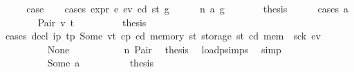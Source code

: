 \begin{isabellebody}
\ \ \isamarkupfalse%
\ \isamarkupfalse%
\ {\isacharquery}{\kern0pt}case\isanewline
\ \ \isamarkupfalse%
\ {\isacharparenleft}{\kern0pt}cases\ {\isachardoublequoteopen}expr\ e\ e\isactrlsub v\ cd\ st\ g{\isachardoublequoteclose}{\isacharparenright}{\kern0pt}\isanewline
\ \ \ \ \isamarkupfalse%
\ {\isacharparenleft}{\kern0pt}n\ a\ g{\isacharprime}{\kern0pt}{\isacharprime}{\kern0pt}{\isacharparenright}{\kern0pt}\isanewline
\ \ \ \ \isamarkupfalse%
\ \isamarkupfalse%
\ {\isacharquery}{\kern0pt}thesis\isanewline
\ \ \ \ \isamarkupfalse%
\ {\isacharparenleft}{\kern0pt}cases\ a{\isacharparenright}{\kern0pt}\isanewline
\ \ \ \ \ \ \isamarkupfalse%
\ {\isacharparenleft}{\kern0pt}Pair\ v\ t{\isacharparenright}{\kern0pt}\isanewline
\ \ \ \ \ \ \isamarkupfalse%
\ \isamarkupfalse%
\ {\isacharquery}{\kern0pt}thesis\isanewline
\ \ \ \ \ \ \isamarkupfalse%
\ {\isacharparenleft}{\kern0pt}cases\ {\isachardoublequoteopen}decl\ i\isactrlsub p\ t\isactrlsub p\ {\isacharparenleft}{\kern0pt}Some\ {\isacharparenleft}{\kern0pt}v{\isacharcomma}{\kern0pt}t{\isacharparenright}{\kern0pt}{\isacharparenright}{\kern0pt}\ cp\ cd\ {\isacharparenleft}{\kern0pt}memory\ st{\isacharparenright}{\kern0pt}\ {\isacharparenleft}{\kern0pt}storage\ st{\isacharparenright}{\kern0pt}\ {\isacharparenleft}{\kern0pt}cd{\isacharprime}{\kern0pt}{\isacharcomma}{\kern0pt}\ mem{\isacharprime}{\kern0pt}{\isacharcomma}{\kern0pt}\ \ sck{\isacharprime}{\kern0pt}{\isacharcomma}{\kern0pt}\ e\isactrlsub v{\isacharprime}{\kern0pt}{\isacharparenright}{\kern0pt}{\isachardoublequoteclose}{\isacharparenright}{\kern0pt}\isanewline
\ \ \ \ \ \ \ \ \isamarkupfalse%
\ None\isanewline
\ \ \ \ \ \ \ \ \isamarkupfalse%
\ {}{}{\isacharparenleft}{\kern0pt}{}{\isacharparenright}{\kern0pt}\ n\ Pair\ \isamarkupfalse%
\ {\isacharquery}{\kern0pt}thesis\ \isamarkupfalse%
\ load{\isachardot}{\kern0pt}psimps{\isacharparenleft}{\kern0pt}{}{\isacharparenright}{\kern0pt}\ \isamarkupfalse%
\ simp\isanewline
\ \ \ \ \ \ \isamarkupfalse%
\isanewline
\ \ \ \ \ \ \ \ \isamarkupfalse%
\ {\isacharparenleft}{\kern0pt}Some\ a{\isacharparenright}{\kern0pt}\isanewline
\ \ \ \ \ \ \ \ \isamarkupfalse%
\ {\isacharquery}{\kern0pt}thesis\isanewline
\ \ \ \ \ \ \ \ \isamarkupfalse%

\end{isabellebody}
